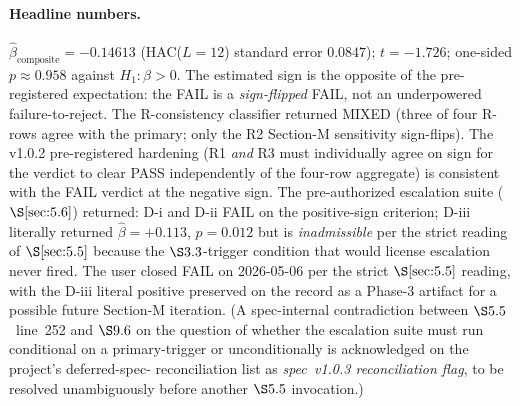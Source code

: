 \paragraph{Headline numbers.}
\(\hat{\beta}_{\mathrm{composite}} = -0.14613\) (HAC(\(L=12\))
standard error \(0.0847\)); \(t = -1.726\); one-sided
\(p \approx 0.958\) against \(H_1: \beta > 0\). The estimated sign is
the opposite of the pre-registered expectation: the FAIL is a
\emph{sign-flipped} FAIL, not an underpowered failure-to-reject.
The R-consistency classifier returned MIXED (three of four R-rows agree
with the primary; only the R2 Section-M sensitivity sign-flips). The
v1.0.2 pre-registered hardening (R1 \emph{and} R3 must individually
agree on sign for the verdict to clear PASS independently of the
four-row aggregate) is consistent with the FAIL verdict at the
negative sign. The pre-authorized escalation suite (\(\S\ref{sec:5.6}\))
returned: D-i and D-ii FAIL on the positive-sign criterion; D-iii
literally returned \(\hat{\beta} = +0.113\), \(p = 0.012\) but is
\emph{inadmissible} per the strict reading of \(\S\ref{sec:5.5}\)
because the \(\S 3.3\)-trigger condition that would license escalation
never fired. The user closed FAIL on 2026-05-06 per the strict
\(\S\ref{sec:5.5}\) reading, with the D-iii literal positive preserved
on the record as a Phase-3 artifact for a possible future Section-M
iteration. (A spec-internal contradiction between
\(\S 5.5\)~line~252 and \(\S 9.6\) on the question of whether the
escalation suite must run conditional on a primary-trigger or
unconditionally is acknowledged on the project's deferred-spec-
reconciliation list as \emph{spec~v1.0.3 reconciliation flag},
to be resolved unambiguously before another \(\S 5.5\) invocation.)


